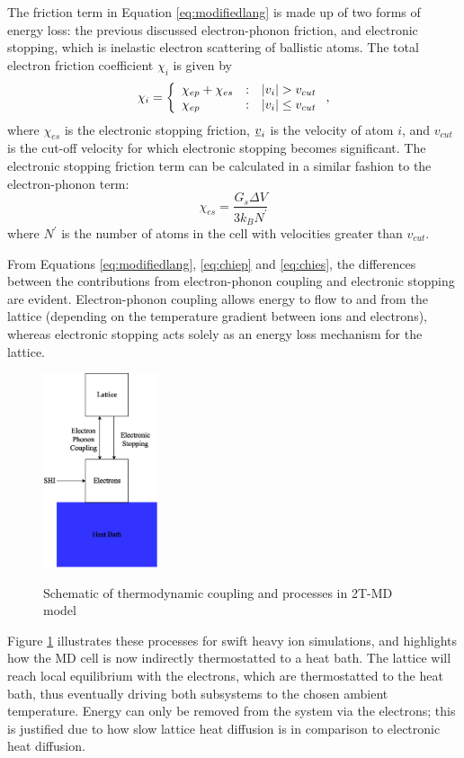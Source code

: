 The friction term in Equation \ref{eq:modifiedlang} is made up of two 
forms of energy loss: the previous discussed electron-phonon friction, 
and electronic stopping, which is inelastic electron scattering of ballistic 
atoms. The total electron friction coefficient $\chi_i$ is given by
\begin{equation}
\chi_{i} = \left\{ \begin{array} {l@{\quad:\quad}l}
\chi_{ep} + \chi_{es} & | v_i | > v_{cut} \\
\chi_{ep} & | v_i | \le v_{cut}
\end{array} \right. ,
\end{equation}
where $\chi_{es}$ is the electronic stopping friction, $\mbox{$\underline{v}$}_{i}$ is 
the velocity of atom $i$, and $v_{cut}$ is the cut-off velocity for which 
electronic stopping becomes significant. The electronic stopping 
friction term can be calculated in a similar fashion to the electron-phonon 
term:
\begin{equation} \label{eq:chies}
\chi_{es} = \frac{G_{s} \Delta V}{3 k_B N^{\prime}}
\end{equation}
where $N^{\prime}$ is the number of atoms in the cell with velocities 
greater than $v_{cut}$.

From Equations 
\ref{eq:modifiedlang}, \ref{eq:chiep} and \ref{eq:chies}, the differences 
between the contributions from electron-phonon coupling and electronic 
stopping are evident. Electron-phonon coupling allows energy to flow to 
and from the lattice (depending on the temperature gradient between ions 
and electrons), whereas electronic stopping acts solely as an energy 
loss mechanism for the lattice.
\begin{figure}[ht] 
	\centering
	{
		\includegraphics[width=0.3\textwidth]{ttmheatbath}
	}
	\caption{Schematic of thermodynamic coupling and processes in 2T-MD model}
	\label{fig:heatbath}
\end{figure}
Figure \ref{fig:heatbath} illustrates these processes for swift heavy ion 
simulations, and highlights how the MD cell is now indirectly thermostatted 
to a heat bath. The lattice will reach local equilibrium with the electrons, 
which are thermostatted to the heat bath, thus eventually driving both 
subsystems to the chosen ambient temperature. Energy can only be 
removed from the system via the electrons; this is justified due to how 
slow lattice heat diffusion is in comparison to electronic heat diffusion.

